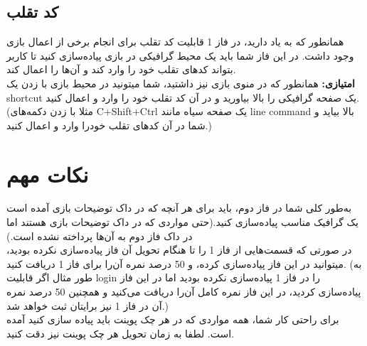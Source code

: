 \documentclass[]{article}
\begin{document}
\subsection*{\titr کد تقلب}
همانطور که به یاد دارید، در فاز 1 قابلیت کد تقلب برای انجام برخی از اعمال بازی وجود داشت. در این فاز شما باید یک محیط گرافیکی در بازی پیاده‌سازی کنید تا کاربر بتواند کدهای تقلب خود را وارد کند و آن‌ها را اعمال کند.
\\
\textbf{امتیازی:} همانطور که در منوی بازی نیز داشتید، شما میتونید در محیط بازی با زدن یک shortcut یک صفحه گرافیکی را بالا بیاورید و در آن کد تقلب خود را وارد و اعمال کنید. (مثلا با زدن دکمه‌های C+Shift+Ctrl یک صفحه سیاه مانند line command بالا بیاید و شما در آن کدهای تقلب خودرا وارد و اعمال کنید.)



\section*{{\titr نکات مهم}}

به‌طور کلی شما در فاز دوم، باید برای هر آنچه که در داک توضیحات بازی آمده است یک گرافیک مناسب پیاده‌سازی کنید.(حتی مواردی که در داک توضیحات بازی هستند اما در داک فاز دوم به آن‌ها پرداخته نشده است.)
\\
در صورتی که قسمت‌هایی از فاز 1 را تا هنگام تحویل آن فاز پیاده‌سازی نکرده بودید، میتوانید در این فاز پیاده‌سازی کرده، و 50 درصد نمره آن‌را برای فاز 1 دریافت کنید. (به طور مثال اگر قابلیت login را در فاز 1 پیاده‌سازی نکرده بودید اما در این فاز پیاده‌سازی کردید، در این فاز نمره کامل آن‌را دریافت می‌کنید و همچنین 50 درصد نمره آن در فاز 1 نیز برایتان ثبت خواهد شد.)\\
برای راحتی کار شما، همه مواردی که در هر چک پوینت باید پیاده سازی کنید آمده است. لطفا به زمان تحویل هر چک پوینت نیز دقت کنید.
\end{document}
